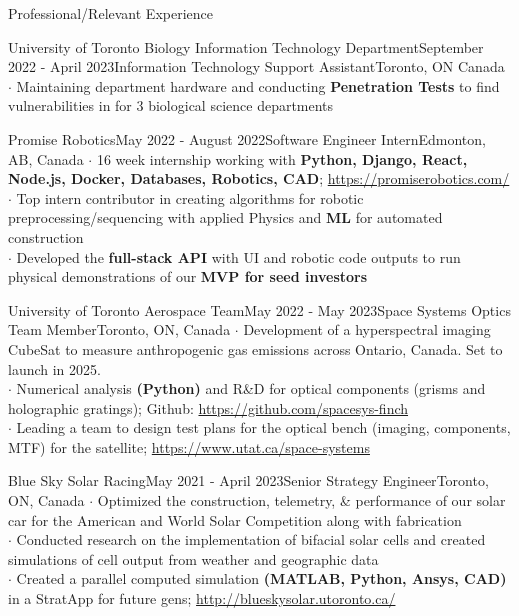 \documentclass[UTF8]{resume} %
\begin{document}
\begin{rSection}{Professional/Relevant Experience}
\begin{rSubsection}{University of Toronto Biology Information Technology Department}{September 2022 - April 2023}{Information Technology Support Assistant}{Toronto, ON Canada}
    $\cdot$ Maintaining department hardware and conducting \textbf{Penetration Tests} to find vulnerabilities in for 3 biological science departments
\end{rSubsection}
\begin{rSubsection}{Promise Robotics}{May 2022 - August 2022}{Software Engineer Intern}{Edmonton, AB, Canada}
    $\cdot$ 16 week internship working with \textbf{Python, Django, React, Node.js, Docker, Databases, Robotics, CAD}; \href{https://promiserobotics.com/}{https://promiserobotics.com/}\\
    $\cdot$ Top intern contributor in creating algorithms for robotic preprocessing/sequencing with applied Physics and \textbf{ML} for automated construction  \\
    $\cdot$ Developed the \textbf{full-stack API} with UI and robotic code outputs to run physical demonstrations of our \textbf{MVP for seed investors}
\end{rSubsection}
\begin{rSubsection}{University of Toronto Aerospace Team}{May 2022 - May 2023}{Space Systems Optics Team Member}{Toronto, ON, Canada}
    $\cdot$ Development of a hyperspectral imaging CubeSat to measure anthropogenic gas emissions across Ontario, Canada. Set to launch in 2025. \\
    $\cdot$ Numerical analysis \textbf{(Python)} and R\&D for optical components (grisms and holographic gratings); Github: \href{https://github.com/spacesys-finch}{https://github.com/spacesys-finch}\\
    $\cdot$ Leading a team to design test plans for the optical bench (imaging, components, MTF) for the satellite; \href{https://www.utat.ca/space-systems}{https://www.utat.ca/space-systems}
\end{rSubsection}
\begin{rSubsection}{Blue Sky Solar Racing}{May 2021 - April 2023}{Senior Strategy Engineer}{Toronto, ON, Canada}
    $\cdot$ Optimized the construction, telemetry, \& performance of our solar car for the American and World Solar Competition along with fabrication\\
    $\cdot$ Conducted research on the implementation of bifacial solar cells and created simulations of cell output from weather and geographic data\\
    $\cdot$ Created a parallel computed simulation \textbf{(MATLAB, Python, Ansys, CAD)} in a StratApp for future gens; \href{http://blueskysolar.utoronto.ca/}{http://blueskysolar.utoronto.ca/}
\end{rSubsection}
\end{rSection}
\end{document}
